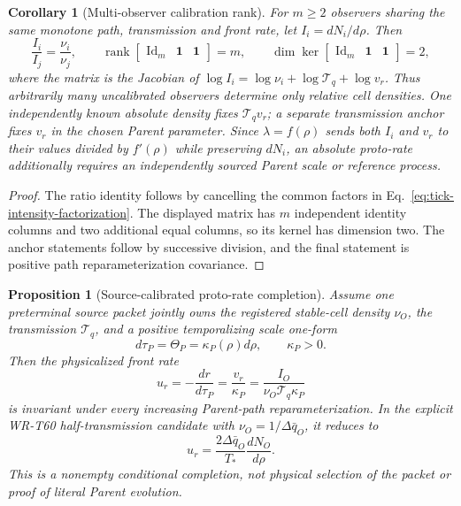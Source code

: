 \documentclass[11pt]{article}
\newtheorem{proposition}{Proposition}
\newtheorem{corollary}{Corollary}
\begin{document}
\begin{corollary}[Multi-observer calibration rank]
For \(m\ge2\) observers sharing the same monotone path, transmission and
front rate, let \(I_i=dN_i/d\rho\).  Then
\begin{equation}
 \frac{I_i}{I_j}=\frac{\nu_i}{\nu_j},
 \qquad
 \operatorname{rank}\begin{bmatrix}\operatorname{Id}_m&\mathbf 1&\mathbf 1\end{bmatrix}=m,
 \qquad
 \dim\ker\begin{bmatrix}\operatorname{Id}_m&\mathbf 1&\mathbf 1\end{bmatrix}=2,
 \label{eq:multiobserver-tick-rank}
\end{equation}
where the matrix is the Jacobian of
\(\log I_i=\log\nu_i+\log\mathcal T_q+\log v_r\).
Thus arbitrarily many uncalibrated observers determine only relative cell
densities.  One independently known absolute density fixes
\(\mathcal T_qv_r\); a separate transmission anchor fixes \(v_r\) in the
chosen Parent parameter.  Since
\(\lambda=f(\rho)\) sends both \(I_i\) and \(v_r\) to their values divided by
\(f'(\rho)\) while preserving \(dN_i\), an absolute proto-rate additionally
requires an independently sourced Parent scale or reference process.
\end{corollary}

\begin{proof}
The ratio identity follows by cancelling the common factors in
Eq.~\eqref{eq:tick-intensity-factorization}.  The displayed matrix has \(m\)
independent identity columns and two additional equal columns, so its kernel
has dimension two.  The anchor statements follow by successive division,
and the final statement is positive path reparameterization covariance.
\end{proof}

\begin{proposition}[Source-calibrated proto-rate completion]
Assume one preterminal source packet jointly owns the registered stable-cell
density \(\nu_O\), the transmission \(\mathcal T_q\), and a positive
temporalizing scale one-form
\begin{equation}
 d\tau_P=\Theta_P=\kappa_P(\rho)d\rho,
 \qquad \kappa_P>0.
 \label{eq:parent-scale-one-form}
\end{equation}
Then the physicalized front rate
\begin{equation}
 \boxed{
 u_r=-\frac{dr}{d\tau_P}
 =\frac{v_r}{\kappa_P}
 =\frac{I_O}{\nu_O\mathcal T_q\kappa_P}}
 \label{eq:source-calibrated-proto-rate}
\end{equation}
is invariant under every increasing Parent-path reparameterization.  In the
explicit WR-T60 half-transmission candidate with
\(\nu_O=1/\Delta\bar q_O\), it reduces to
\begin{equation}
 u_r=\frac{2\Delta\bar q_O}{T_*}\frac{dN_O}{d\rho}.
 \label{eq:half-transmission-calibrated-rate}
\end{equation}
This is a nonempty conditional completion, not physical selection of the
packet or proof of literal Parent evolution.
\end{proposition}
\end{document}
